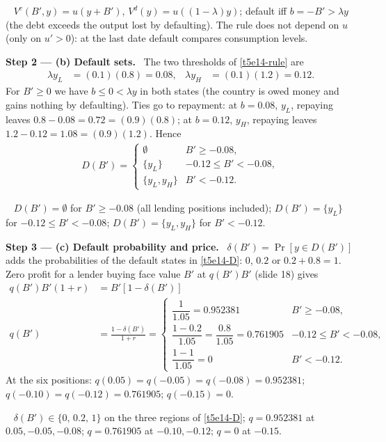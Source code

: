\documentclass[11pt,a4paper]{article}
\newcommand{\step}[2]{\par\medskip\noindent\textbf{Step #1 --- #2.}~}
\newcommand{\answer}[1]{\par\smallskip\noindent\fbox{\textbf{Answer #1.}}~}
\begin{document}
\answer{(a)} $V^c(B',y)=u(y+B')$, $V^d(y)=u((1-\lambda)y)$; default iff $b=-B'>\lambda y$ (the debt exceeds the output lost by
defaulting). The rule does not depend on $u$ (only on $u'>0$): at the last date default compares consumption levels.

\step{2}{(b) Default sets} The two thresholds of \eqref{t5e14-rule} are
\begin{align}
  \lambda y_L &= (0.1)(0.8) = 0.08, & \lambda y_H &= (0.1)(1.2) = 0.12. \nonumber
\end{align}
For $B'\ge0$ we have $b\le0<\lambda y$ in both states (the country is owed money and gains nothing by defaulting). Ties go to repayment:
at $b=0.08$, $y_L$, repaying leaves $0.8-0.08=0.72=(0.9)(0.8)$; at $b=0.12$, $y_H$, repaying leaves $1.2-0.12=1.08=(0.9)(1.2)$. Hence
\begin{align}
  D(B') = \begin{cases} \emptyset & B'\ge-0.08,\\ \{y_L\} & -0.12\le B'<-0.08,\\ \{y_L,y_H\} & B'<-0.12. \end{cases} \label{t5e14-D}
\end{align}

\answer{(b)} $D(B')=\emptyset$ for $B'\ge-0.08$ (all lending positions included); $D(B')=\{y_L\}$ for $-0.12\le B'<-0.08$; $D(B')=\{y_L,y_H\}$ for $B'<-0.12$.

\step{3}{(c) Default probability and price} $\delta(B')=\Pr[y\in D(B')]$ adds the probabilities of the default states in \eqref{t5e14-D}: $0$, $0.2$
or $0.2+0.8=1$. Zero profit for a lender buying face value $B'$ at $q(B')B'$ (slide 18) gives
\begin{align}
  q(B')B'(1+r) &= B'[1-\delta(B')] \nonumber\\
  q(B') &= \frac{1-\delta(B')}{1+r}
   = \begin{cases} \dfrac{1}{1.05} = 0.952381 & B'\ge-0.08,\\[6pt] \dfrac{1-0.2}{1.05}=\dfrac{0.8}{1.05} = 0.761905 & -0.12\le B'<-0.08,\\[6pt] \dfrac{1-1}{1.05}=0 & B'<-0.12. \end{cases} \label{t5e14-q}
\end{align}
At the six positions: $q(0.05)=q(-0.05)=q(-0.08)=0.952381$; $q(-0.10)=q(-0.12)=0.761905$; $q(-0.15)=0$.

\answer{(c)} $\delta(B')\in\{0,\,0.2,\,1\}$ on the three regions of \eqref{t5e14-D}; $q=0.952381$ at $0.05,-0.05,-0.08$; $q=0.761905$ at $-0.10,-0.12$; $q=0$ at $-0.15$.
\end{document}
